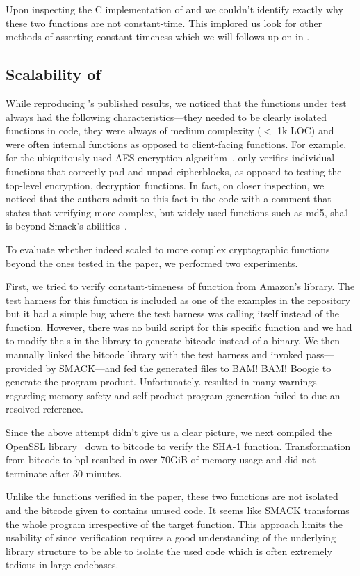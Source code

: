 Upon inspecting the C implementation of  and 
we couldn't identify exactly why these two functions are not constant-time.
This implored us look for other methods of asserting constant-timeness which
we will follows up on in .



\subsection{Scalability of \ctVerif}

While reproducing \ctVerif's published results, we noticed that the functions under test always had the following characteristics---they needed to be clearly isolated functions in code, they were always of medium complexity ($<$ 1k LOC) and were often internal functions as opposed to client-facing functions.
For example, for the ubiquitously used AES encryption algorithm~\cite{aes}, \ctVerif only verifies individual functions that correctly pad and unpad cipherblocks, as opposed to testing the top-level encryption, decryption functions.
In fact, on closer inspection, we noticed that the authors admit to this fact in the code with a comment that states that verifying more complex, but widely used functions such as md5, sha1 is beyond Smack's abilities~\cite{scalability-comment}.


To evaluate whether \ctVerif indeed scaled to more complex cryptographic functions beyond the ones tested in the paper, we performed two experiments.

First, we tried to verify
constant-timeness of function  from Amazon's
 library. The test harness for this function is included as one of the
examples in the \ctVerif repository but it had a simple bug where the test
harness was calling itself instead of the  function.
However, there was no build script for this specific function and we had to modify the
s in the  library to generate
 bitcode instead of a binary. We then manually linked the bitcode
library with the test harness and invoked  pass---provided by
SMACK---and fed the generated  files to BAM! BAM! Boogie to
generate the program product. Unfortunately.  resulted in
many warnings regarding memory safety and self-product program generation failed
to due an resolved reference.

Since the above attempt didn't give us a clear picture, we next compiled the OpenSSL library~\cite{openssl} down to 
bitcode to verify the SHA-1 function. Transformation from bitcode to bpl
resulted in over 70GiB of memory usage and did not terminate after 30 minutes.

Unlike the functions verified in the paper, these two functions are not
isolated and the bitcode given to \ctVerif contains unused code. It seems like
SMACK transforms the whole program irrespective of the target function. This
approach limits the usability of \ctVerif since verification requires a good
understanding of the underlying library structure to be able to isolate the used
code which is often extremely tedious in large codebases.
